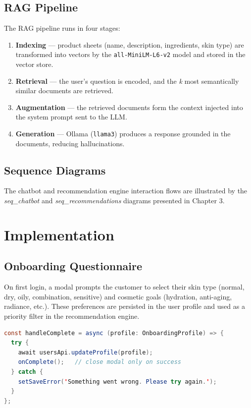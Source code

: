 \subsection{RAG Pipeline}

The RAG pipeline runs in four stages:

\begin{enumerate}
  \item \textbf{Indexing} --- product sheets (name, description, ingredients,
        skin type) are transformed into vectors by the
        \texttt{all-MiniLM-L6-v2} model and stored in the vector store.
  \item \textbf{Retrieval} --- the user's question is encoded, and the
        \textit{k} most semantically similar documents are retrieved.
  \item \textbf{Augmentation} --- the retrieved documents form the context
        injected into the system prompt sent to the LLM.
  \item \textbf{Generation} --- Ollama (\texttt{llama3}) produces a response
        grounded in the documents, reducing hallucinations.
\end{enumerate}

\subsection{Sequence Diagrams}

The chatbot and recommendation engine interaction flows are illustrated by
the \textit{seq\_chatbot} and \textit{seq\_recommendations} diagrams
presented in Chapter 3.

\section{Implementation}

\subsection{Onboarding Questionnaire}

On first login, a modal prompts the customer to select their skin type
(normal, dry, oily, combination, sensitive) and cosmetic goals
(hydration, anti-aging, radiance, etc.).
These preferences are persisted in the user profile and used as a
priority filter in the recommendation engine.

\begin{lstlisting}[language=Java, caption=Saving the onboarding profile (OnboardingModal.tsx)]
const handleComplete = async (profile: OnboardingProfile) => {
  try {
    await usersApi.updateProfile(profile);
    onComplete();   // close modal only on success
  } catch {
    setSaveError('Something went wrong. Please try again.');
  }
};
\end{lstlisting}

